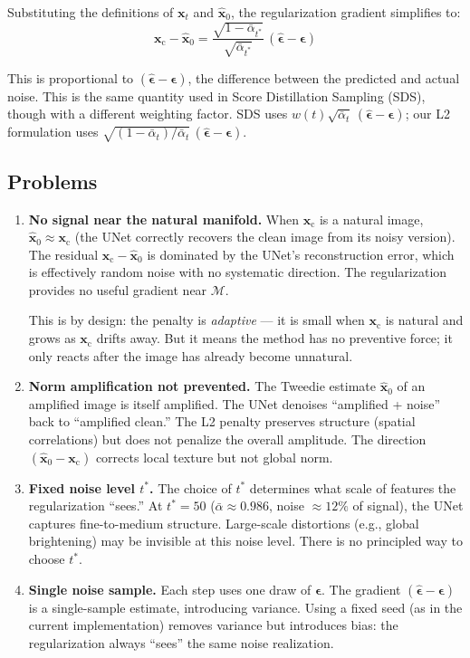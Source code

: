 \documentclass[11pt]{article}
\newcommand{\xb}{\mathbf{x}}
\newcommand{\xc}{\xb_{\mathrm{c}}}  %
\newcommand{\eb}{\boldsymbol{\epsilon}}
\newcommand{\alphabar}{\bar{\alpha}}
\begin{document}
Substituting the definitions of $\xb_t$ and $\hat{\xb}_0$, the regularization gradient simplifies to:
\begin{equation}
    \xc - \hat{\xb}_0
    = \frac{\sqrt{1-\alphabar_{t^*}}}{\sqrt{\alphabar_{t^*}}}\,(\hat{\eb} - \eb)
    \label{eq:sds_connection}
\end{equation}

This is proportional to $(\hat{\eb} - \eb)$, the difference between the predicted and actual noise.
This is the same quantity used in Score Distillation Sampling (SDS), though with a different
weighting factor. SDS uses $w(t)\sqrt{\alphabar_t}\,(\hat{\eb} - \eb)$; our L2 formulation
uses $\sqrt{(1-\alphabar_t)/\alphabar_t}\,(\hat{\eb} - \eb)$.

\subsection{Problems}

\begin{enumerate}
    \item \textbf{No signal near the natural manifold.}
    When $\xc$ is a natural image, $\hat{\xb}_0 \approx \xc$ (the UNet correctly recovers
    the clean image from its noisy version). The residual $\xc - \hat{\xb}_0$ is dominated
    by the UNet's reconstruction error, which is effectively random noise with no systematic
    direction. The regularization provides no useful gradient near $\mathcal{M}$.

    This is by design: the penalty is \emph{adaptive} --- it is small when $\xc$ is natural
    and grows as $\xc$ drifts away. But it means the method has no preventive force; it only
    reacts after the image has already become unnatural.

    \item \textbf{Norm amplification not prevented.}
    The Tweedie estimate $\hat{\xb}_0$ of an amplified image is itself amplified. The UNet
    denoises ``amplified + noise'' back to ``amplified clean.'' The L2 penalty preserves
    structure (spatial correlations) but does not penalize the overall amplitude. The direction
    $(\hat{\xb}_0 - \xc)$ corrects local texture but not global norm.

    \item \textbf{Fixed noise level $t^*$.}
    The choice of $t^*$ determines what scale of features the regularization ``sees.''
    At $t^* = 50$ ($\alphabar \approx 0.986$, noise $\approx 12\%$ of signal), the UNet
    captures fine-to-medium structure. Large-scale distortions (e.g., global brightening)
    may be invisible at this noise level. There is no principled way to choose $t^*$.

    \item \textbf{Single noise sample.}
    Each step uses one draw of $\eb$. The gradient $(\hat{\eb} - \eb)$ is a single-sample
    estimate, introducing variance. Using a fixed seed (as in the current implementation)
    removes variance but introduces bias: the regularization always ``sees'' the same
    noise realization.
\end{enumerate}
\end{document}

